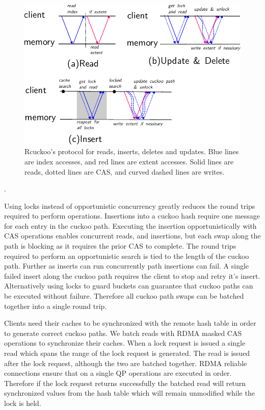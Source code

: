 \begin{figure}[t]
\includegraphics[width=0.99\linewidth]{fig/message_diagram.pdf}

\caption{Rcuckoo's protocol for reads, inserts, deletes and
updates. Blue lines are index accesses, and red lines are
extent accesses. Solid lines are reads, dotted lines are
CAS, and curved dashed lines are writes. }

\label{fig:message_diagram} \end{figure}.

Using locks instead of opportunistic concurrency greatly
reduces the round trips required to perform operations.
Insertions into a cuckoo hash require one message for each
entry in the cuckoo path. Executing the insertion
opportunistically with CAS operations enables concurrent
reads, and insertions, but each swap along the path is
blocking as it requires the prior CAS to complete. The round
trips required to perform an opportunistic search is tied to
the length of the cuckoo path. Further as inserts can run
concurrently path insertions can fail. A single failed
insert along the cuckoo path requires the client to stop and
retry it's insert. Alternatively using locks to guard
buckets can guarantee that cuckoo paths can be executed
without failure. Therefore all cuckoo path swaps can be
batched together into a single round trip.

Clients need their caches to be synchronized with the remote
hash table in order to generate correct cuckoo paths. We
batch reads with RDMA masked CAS operations to synchronize
their caches. When a lock request is issued a single read
which spans the range of the lock request is generated. The
read is issued after the lock request, although the two are
batched together. RDMA reliable connections ensure that on a
single QP operations are executed in order. Therefore if the
lock request returns successfully the batched read will
return synchronized values from the hash table which will
remain unmodified while the lock is held.

